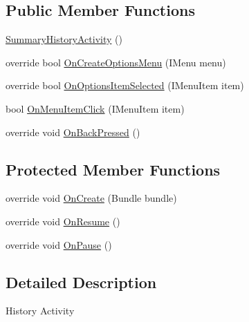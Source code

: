 \subsection*{Public Member Functions}
\begin{DoxyCompactItemize}
\item 
\hyperlink{class_field_service_1_1_android_1_1_activities_1_1_summary_history_activity_a82f9835f29e0cd408806ced16096f4b1}{Summary\+History\+Activity} ()
\item 
override bool \hyperlink{class_field_service_1_1_android_1_1_activities_1_1_summary_history_activity_ac0ee2d26e465da2d767e6313f0246283}{On\+Create\+Options\+Menu} (I\+Menu menu)
\item 
override bool \hyperlink{class_field_service_1_1_android_1_1_activities_1_1_summary_history_activity_af25a786207029ce9bbe678950cf01f39}{On\+Options\+Item\+Selected} (I\+Menu\+Item item)
\item 
bool \hyperlink{class_field_service_1_1_android_1_1_activities_1_1_summary_history_activity_a36bb8ca41977eacd78c2233ec06f575d}{On\+Menu\+Item\+Click} (I\+Menu\+Item item)
\item 
override void \hyperlink{class_field_service_1_1_android_1_1_activities_1_1_summary_history_activity_af52f8c4b1bf93f7eff2ced161164a638}{On\+Back\+Pressed} ()
\end{DoxyCompactItemize}
\subsection*{Protected Member Functions}
\begin{DoxyCompactItemize}
\item 
override void \hyperlink{class_field_service_1_1_android_1_1_activities_1_1_summary_history_activity_a7ea3f146fd0ba6fee3f14fb30d427411}{On\+Create} (Bundle bundle)
\item 
override void \hyperlink{class_field_service_1_1_android_1_1_activities_1_1_summary_history_activity_a5a23c0fab1d06779b1859c3c23a7486d}{On\+Resume} ()
\item 
override void \hyperlink{class_field_service_1_1_android_1_1_activities_1_1_summary_history_activity_abe7c8fbcc50d683ca32cdff80debead1}{On\+Pause} ()
\end{DoxyCompactItemize}


\subsection{Detailed Description}
History Activity 



